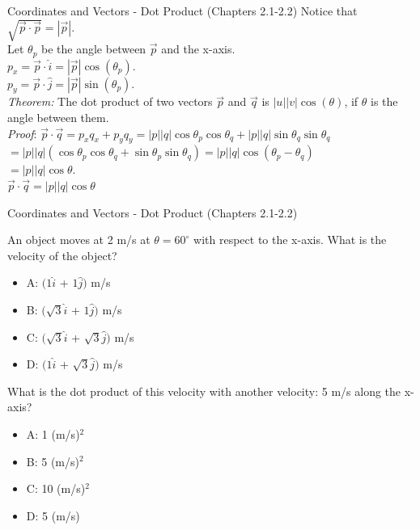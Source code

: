 \documentclass{beamer}
\begin{document}
\begin{frame}{Coordinates and Vectors - Dot Product (Chapters 2.1-2.2)}
Notice that $\sqrt{\vec{p}\cdot\vec{p}} = |\vec{p}|$.\\
Let $\theta_p$ be the angle between $\vec{p}$ and the x-axis.  \\
$p_{x} = \vec{p} \cdot \hat{i} = |\vec{p}| \cos(\theta_{p})$. \\
$p_{y} = \vec{p} \cdot \hat{j} = |\vec{p}| \sin(\theta_{p})$.\\
\vspace{0.5cm}
\textit{Theorem:} The dot product of two vectors $\vec{p}$ and $\vec{q}$ is $|u||v|\cos(\theta)$, if $\theta$ is the angle between them.\\
\vspace{0.5cm}
\textit{Proof}: $\vec{p}\cdot\vec{q} = p_{x}q_{x} + p_{y}q_{y} = |p||q|\cos\theta_p\cos\theta_q+|p||q|\sin\theta_q\sin\theta_q$ \\
$=|p||q|(\cos\theta_p\cos\theta_q+\sin\theta_p\sin\theta_q) = |p||q|\cos(\theta_p-\theta_q)$ \\
$=|p||q|\cos\theta$. \\
\vspace{0.1cm}
$\boxed{\vec{p}\cdot\vec{q}=|p||q|\cos\theta}$
\end{frame}

\begin{frame}{Coordinates and Vectors - Dot Product (Chapters 2.1-2.2)}
\small
\begin{minipage}[b]{0.45\linewidth}
An object moves at 2 m/s at $\theta = 60^{\circ}$ with respect to the x-axis.  What is the velocity of the object?
\vspace{0.2cm}
\begin{itemize}
\item A: $(1\hat{i}$ + $1\hat{j})$  m/s
\item B: $(\sqrt{3}\hat{i}$ + $1\hat{j})$  m/s
\item C: $(\sqrt{3}\hat{i}$ + $\sqrt{3}\hat{j})$  m/s
\item D: $(1\hat{i}$ + $\sqrt{3}\hat{j})$  m/s
\end{itemize}
\end{minipage}
\hspace{0.5cm}
\begin{minipage}[b]{0.45\linewidth}
What is the dot product of this velocity with another velocity: 5 m/s along the x-axis?
\vspace{0.7cm}
\begin{itemize}
\item A: 1 (m/s)$^2$
\item B: 5 (m/s)$^2$
\item C: 10 (m/s)$^2$
\item D: 5 (m/s)
\end{itemize}
\end{minipage}
\end{frame}
\end{document}
